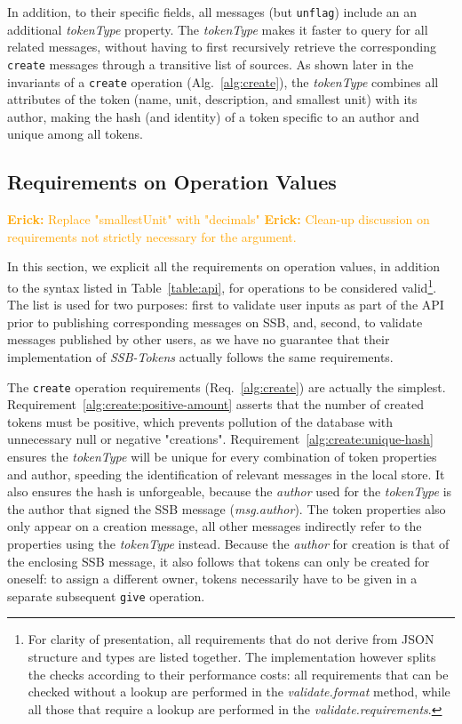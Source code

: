 \documentclass[sigplan,screen,10pt]{acmart}
\newcommand\el[1]{\textcolor{orange}{{\bf Erick: }#1}}
\newcommand\ssbtokens[0]{\textit{SSB-Tokens} }
\begin{document}
In addition, to their specific fields, all messages (but \texttt{unflag}) include an  an additional \textit{tokenType} property. The \textit{tokenType} makes it faster to query for all related messages, without having to first recursively retrieve the corresponding \texttt{create} messages through a transitive list of sources. As shown later in the invariants of a \texttt{create} operation (Alg.~\ref{alg:create}), the \textit{tokenType} combines all attributes of the token (name, unit, description, and smallest unit) with its author, making the hash (and identity) of a token specific to an author and unique among all tokens.

\subsection{Requirements on Operation Values}
\el{Replace "smallestUnit" with "decimals"}
\el{Clean-up discussion on requirements not strictly necessary for the argument.}\

In this section, we explicit all the requirements on operation values, in addition to the syntax listed in Table~\ref{table:api}, for operations to be considered valid\footnote{For clarity of presentation, all requirements that do not derive from JSON structure and types are listed together. The implementation however splits the checks according to their performance costs: all requirements that can be checked without a lookup are performed in the \textit{validate.format} method, while all those that require a lookup are performed in the \textit{validate.requirements}.}. The list is used for two purposes: first to validate user inputs as part of the API prior to publishing corresponding messages on SSB, and, second, to validate messages published by other users, as we have no guarantee that their implementation of \ssbtokens actually follows the same requirements.

The \texttt{create} operation requirements (Req.~\ref{alg:create}) are actually the simplest. Requirement~\ref{alg:create:positive-amount} asserts that the number of created tokens must be positive, which prevents pollution of the database with unnecessary null or negative "creations". Requirement~\ref{alg:create:unique-hash} ensures the \textit{tokenType} will be unique for every combination of token properties and author, speeding the identification of relevant messages in the local store. It also ensures the hash is unforgeable, because the \textit{author} used for the \textit{tokenType} is the author that signed the SSB message (\textit{msg.author}).  The token properties also only appear on a creation message, all other messages indirectly refer to the properties using the \textit{tokenType} instead. Because the \textit{author} for creation is that of the enclosing SSB message, it also follows that tokens can only be created for oneself: to assign a different owner, tokens necessarily have to be given in a separate subsequent \texttt{give} operation.
\end{document}
